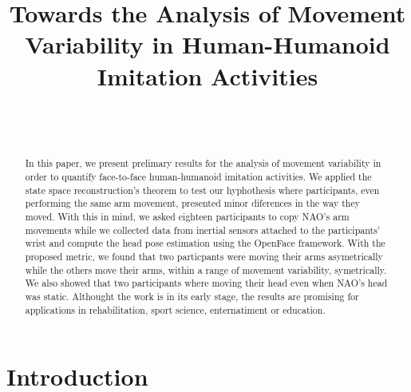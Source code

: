 \documentclass{sigchi}
\def\plaintitle{Towards the Analysis of Movement Variability in Human-Humanoid Imitation Activities}
\def\plainkeywords{Authors' choice; of terms; separated; by
  semicolons; include commas, within terms only; required.}
\begin{document}
\title{\plaintitle}

\author{%
  \\
  \\
}

\maketitle

\begin{abstract}
  In this paper, we present prelimary results for the analysis of movement
  variability in order to quantify face-to-face human-humanoid imitation activities.
  We applied the state space reconstruction's theorem to test our
  hyphothesis where participants, even performing the same arm movement,
  presented minor diferences in the way they moved.
  With this in mind, we asked eighteen participants to copy NAO's arm
  movements while we collected data from inertial sensors attached to the participants' wrist
  and compute the head pose estimation using the OpenFace framework.
  With the proposed metric, we found that two particpants were moving their arms
  asymetrically while the others move their arms, within a range of movement
  variability, symetrically. We also showed that two participants where moving
  their head even when NAO's head was static.
  Althought the work is in its early stage, the results are promising for
  applications in rehabilitation, sport science, enternatiment or education.
\end{abstract}




\section{Introduction}
\end{document}
